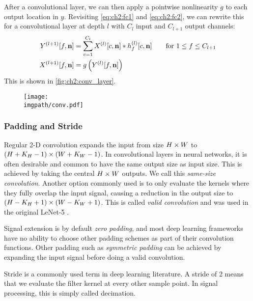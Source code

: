 After a convolutional layer, we can then apply a pointwise nonlinearity $g$ to
each output location in $y$. Revisiting \eqref{eq:ch2:fc1} and \eqref{eq:ch2:fc2}, we can 
rewrite this for a convolutional layer at depth $l$ with $C_l$ input and
$C_{l+1}$ output channels:
\begin{align}
  Y^{(l+1)}[f, \mathbf{n}] &= \sum_{c=1}^{C_l} X^{(l)}[c, \mathbf{n}] \ast h^{(l)}_f[c, \mathbf{n}] \qquad 
    \text{for } 1 \leq f \leq C_{l+1} \label{eq:ch2:conv4}\\
  X^{(l+1)}[f, \mathbf{n}] &= g\left(Y^{(l)}[f, \mathbf{n}]\right)
\end{align}
This is shown in \autoref{fig:ch2:conv_layer}.

\begin{figure}
  \centering
  \texttt{[image: \\imgpath/conv.pdf]}
  \label{fig:ch2:conv_layer}
\end{figure}

\subsubsection{Padding and Stride}
Regular 2-D convolution expands the input from size $H\times W$ to $(H+K_H-1)\times
(W+K_W-1)$. In convolutional layers in neural networks, it is often desirable
and common to have the same output size as input size. This is achieved by
taking the central $H\times W$ outputs. We call this \emph{same-size convolution}.
Another option commonly used is to only evaluate the kernels where they fully
overlap the input signal, causing a reduction in the output size to $(H-K_H+1)
\times (W-K_W+1)$. This is called \emph{valid convolution} and was used in the
original LeNet-5 \cite{lecun_gradient-based_1998}.

Signal extension is by default \emph{zero padding}, and most deep learning
frameworks have no ability to choose other padding schemes as part of their
convolution functions. Other padding such as \emph{symmetric padding} can be
achieved by expanding the input signal before doing a valid convolution.

Stride is a commonly used term in deep learning literature. A stride of 2 means
that we evaluate the filter kernel at every other sample point. In signal
processing, this is simply called decimation.

